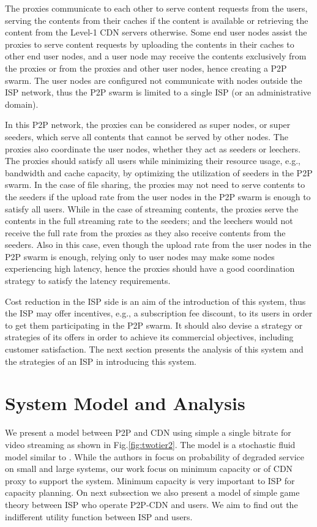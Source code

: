\documentclass[paper]{ieice}
\begin{document}
The proxies communicate to each other to serve content requests from the users, serving the contents from their caches if the content is available 
or retrieving the content from the Level-1 CDN servers otherwise.
Some end user nodes assist the proxies to serve content requests by uploading the contents in their caches to other end user nodes, and a user node may receive the contents exclusively from the proxies or from the proxies and other user nodes, hence creating a P2P swarm.
The user nodes are configured not communicate with nodes outside the ISP network, thus the P2P swarm is limited to a single ISP (or an administrative domain).

In this P2P network, the proxies can be considered as super nodes, or super seeders, which serve all contents that cannot be served by other nodes.
The proxies also coordinate the user nodes, whether they act as seeders or leechers.
The proxies should satisfy all users while minimizing their resource usage, e.g., bandwidth and cache capacity, by optimizing the utilization of seeders in the P2P swarm.
In the case of file sharing, the proxies may not need to serve contents to the seeders if the upload rate from the user nodes in the P2P swarm is enough to satisfy all users.
While in the case of streaming contents, the proxies serve the contents in the full streaming rate to the seeders;
and the leechers would not receive the full rate from the proxies as they also receive contents from the seeders.
Also in this case, even though the upload rate from the user nodes in the P2P swarm is enough, relying only to user nodes may make some nodes experiencing high latency,
hence the proxies should have a good coordination strategy to satisfy the latency requirements.

Cost reduction in the ISP side is an aim of the introduction of this system, thus the ISP may offer incentives, e.g., a subscription fee discount, to its users in order to get them participating in the P2P swarm.
It should also devise a strategy or strategies of its offers in order to achieve its commercial objectives, including customer satisfaction.
The next section presents the analysis of this system and the strategies of an ISP in introducing this system.

  
 
\section{System Model and Analysis}\label{systemmodel}
We present a model between P2P and CDN using simple a single bitrate for video streaming as shown in Fig.\ref{fig:twotier2}. 
The model is a stochastic fluid model similar to \cite{4215694}.
While the authors in \cite{4215694} focus on probability of degraded service on small and large systems, our work focus on minimum capacity or of CDN proxy to support the system.
Minimum capacity is very important to ISP for capacity planning.
On next subsection we also present a model of simple game theory between ISP who operate P2P-CDN and users.
We aim to find out the indifferent utility function between ISP and users.
\end{document}

